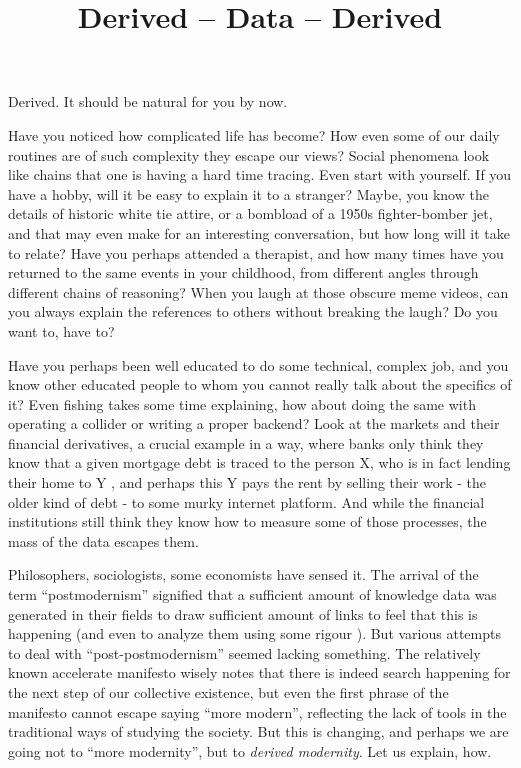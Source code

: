 \documentclass{article}
\title{Derived -- Data -- Derived}
\author{}
\begin{document}
\thispagestyle{empty}

\maketitle

\noindent Derived. It should be natural for you by now.




Have you noticed how complicated life has become? How even some of our daily routines are of such complexity they escape our views? Social phenomena look like chains that one is having a hard time tracing. Even start with yourself. If you have a hobby, will it be easy to explain it to a stranger? Maybe, you know the details of historic white tie attire, or a bombload of a 1950s fighter-bomber jet, and that may even make for an interesting conversation, but how long will it take to relate? Have you perhaps attended a therapist, and how many times have you returned to the same events in your childhood, from different angles through different chains of reasoning?
When you laugh at those obscure meme videos, can you always explain the references to others without breaking the laugh? Do you want to, have to?


Have you perhaps been well educated to do some technical, complex job, and you know other educated people to whom you cannot really talk about the specifics of it? Even fishing takes some time explaining, how about doing the same with operating a collider or writing a proper backend? Look at the markets and their financial derivatives, a crucial example in a way, where banks only think they know that a given mortgage debt is traced to the person X, who is in fact lending their home to Y \cite{BGSHT}, and perhaps this Y pays the rent by selling their work - the older kind of debt - to some murky internet platform. And while the financial institutions still think they know how to measure some of those processes, the mass of the data escapes them.

Philosophers, sociologists, some economists have sensed it. The arrival of the term “postmodernism” signified that a sufficient amount of knowledge data was generated in their fields to draw sufficient amount of links to feel that this is happening (and even to analyze them using some rigour \cite{MORAVA}). But various attempts to deal with “post-postmodernism” seemed lacking something. The relatively known accelerate manifesto \cite{SRNICEK} wisely notes that there is indeed search happening for the next step of our collective existence, but even the first phrase of the manifesto cannot escape saying “more modern”, reflecting the lack of tools in the traditional ways of studying the society. But this is changing, and perhaps we are going not to ``more modernity'', but to \emph{derived modernity}. Let us explain, how.
\end{document}
